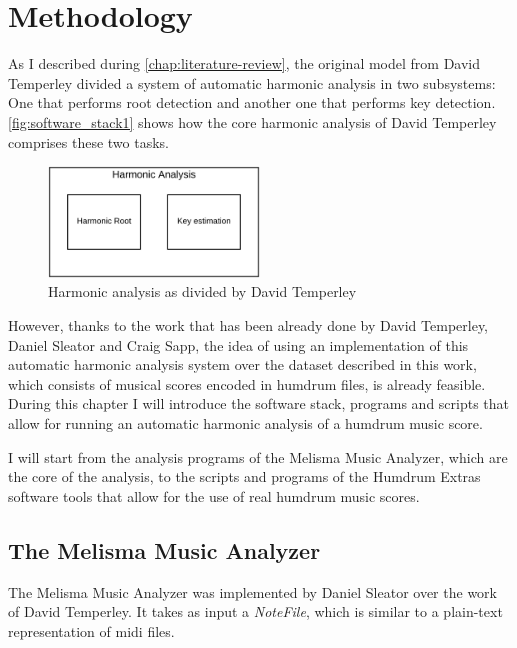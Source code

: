 \normallinespacing

\chapter{Methodology}
\label{chap:methodology}

As I described during \autoref{chap:literature-review}, the original model from David Temperley divided a system of automatic harmonic analysis in two subsystems: One that performs root detection and another one that performs key detection. \autoref{fig:software_stack1} shows how the core harmonic analysis of David Temperley comprises these two tasks.

\begin{figure}[ht]
  \centering
    \includegraphics[width=0.5\textwidth]{04-methodology/figures/1}
  \caption{Harmonic analysis as divided by David Temperley}
  \label{fig:software_stack1}
\end{figure}

However, thanks to the work that has been already done by David Temperley, Daniel Sleator and Craig Sapp, the idea of using an implementation of this automatic harmonic analysis system over the dataset described in this work, which consists of musical scores encoded in humdrum files, is already feasible. During this chapter I will introduce the software stack, programs and scripts that allow for running an automatic harmonic analysis of a humdrum music score.

I will start from the analysis programs of the Melisma Music Analyzer, which are the core of the analysis, to the scripts and programs of the Humdrum Extras software tools that allow for the use of real humdrum music scores.

\section{The Melisma Music Analyzer}
  The Melisma Music Analyzer was implemented by Daniel Sleator over the work of David Temperley. It takes as input a \emph{NoteFile}, which is similar to a plain-text representation of midi files.

